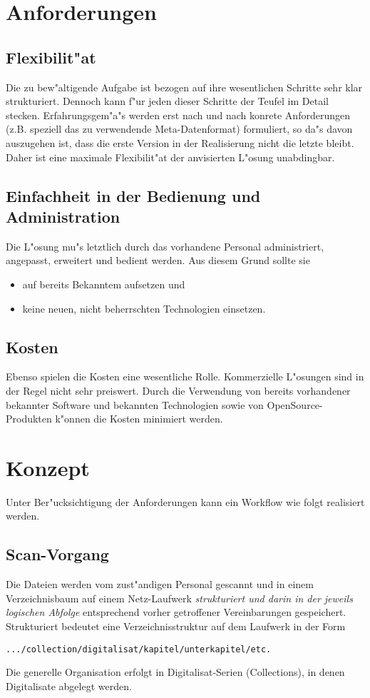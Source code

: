 \documentclass[11pt, twoside, a4paper, BCOR8mm, DIV12, bibtotoc,idxtotoc]{scrreprt}
\begin{document}
\section{Anforderungen}

\subsection{Flexibilit"at}
Die zu bew"altigende Aufgabe ist bezogen auf ihre wesentlichen
Schritte sehr klar strukturiert. Dennoch kann f"ur jeden dieser
Schritte der Teufel im Detail stecken. Erfahrungsgem"a"s werden erst
nach und nach konrete Anforderungen (z.B. speziell das zu verwendende
Meta-Datenformat) formuliert, so da"s davon auszugehen ist, dass die
erste Version in der Realisierung nicht die letzte bleibt. Daher ist
eine maximale Flexibilit"at der anvisierten L"osung unabdingbar.


\subsection{Einfachheit in der Bedienung und Administration}
Die L"osung mu"s letztlich durch das vorhandene Personal
administriert, angepasst, erweitert und bedient werden. Aus diesem
Grund sollte sie 
\begin{itemize}
\item auf bereits Bekanntem aufsetzen und
\item keine neuen, nicht beherrschten Technologien einsetzen. 
\end{itemize}

\subsection{Kosten}
Ebenso spielen die Kosten eine wesentliche Rolle. Kommerzielle
L"osungen sind in der Regel nicht sehr preiswert. Durch die Verwendung
von bereits vorhandener bekannter Software und bekannten Technologien
sowie von OpenSource-Produkten k"onnen die Kosten minimiert werden.


\section{Konzept}
Unter Ber"ucksichtigung der Anforderungen kann ein Workflow wie folgt
realisiert werden.

\subsection{Scan-Vorgang}
Die Dateien werden vom zust"andigen Personal gescannt und in einem
Verzeichnisbaum auf einem Netz-Laufwerk \emph{struk\-tu\-riert und
  darin in der jeweils logischen Abfolge} entsprechend vorher
getroffener Vereinbarungen gespeichert. Strukturiert bedeutet eine
Verzeich\-nis\-struk\-tur auf dem Laufwerk in der Form
\begin{verbatim}
.../collection/digitalisat/kapitel/unterkapitel/etc.
\end{verbatim}
Die generelle Organisation erfolgt in Digitalisat-Serien
(Collections), in denen Digitalisate abgelegt werden. 
\end{document}
